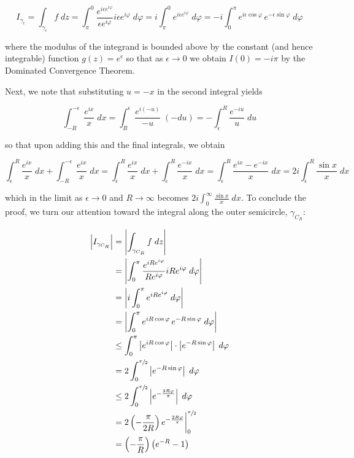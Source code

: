 \begin{solution}
    $$
    I_{\gamma_{\epsilon}} 
      = \int_{\gamma_{\epsilon}} {f \; dz } 
      = \int_{\pi}^{0} {\frac{e^{i \epsilon e^{i \varphi}}}{\epsilon e^{i \varphi}} i \epsilon e^{i \varphi} \; d\varphi }
      = i \int_{\pi}^{0} {e^{i \epsilon e^{i \varphi}} \; d\varphi }
      = -i \int_{0}^{\pi} {e^{i \epsilon \cos{\varphi}} \, e^{-\epsilon \sin{\varphi}} \; d\varphi }
    $$

    where the modulus of the integrand is bounded above by the constant (and hence integrable) function 
    $g(z) = e^{\epsilon}$ so that as $\epsilon \to 0$ we obtain $I(0) = -i \pi$ by the Dominated Convergence Theorem.
    
    \pagebreak
    Next, we note that substituting $u = -x$ in the second integral yields

    $$
    \int_{-R}^{-\epsilon} {\frac{e^{ix}}{x} \; dx} 
    = \int_{R}^{\epsilon} {\frac{e^{i(-u)}}{-u} \; (-du)}
    = -\int_{\epsilon}^{R} {\frac{e^{-iu}}{u} \; du}
    $$

    so that upon adding this and the final integrals, we obtain

    $$
    \int_{\epsilon}^{R} {\frac{e^{ix}}{x} \; dx} + \int_{-R}^{-\epsilon} {\frac{e^{ix}}{x} \; dx} 
    = \int_{\epsilon}^{R} {\frac{e^{ix}}{x} \; dx} + \int_{\epsilon}^{R} {\frac{e^{-ix}}{x} \; dx}
    = \int_{\epsilon}^{R} {\frac{e^{ix} - e^{-ix}}{x} \; dx}
    = 2i \int_{\epsilon}^{R} {\frac{\sin{x}}{x} \; dx}
    $$

    which in the limit as $\epsilon \to 0$ and $R \to \infty$ becomes $2i \int_{0}^{\infty} {\frac{\sin{x}}{x} \; dx}$.
    To conclude the proof, we turn our attention toward the integral along the outer semicircle, $\gamma_{C_R}$:

    \begin{align*}
    \left| I_{\gamma_{C_R}} \right|
      &= \left| \int_{\gamma_{C_R}} {f \; dz } \right| \\
      &= \left| \int_{0}^{\pi} {\frac{e^{i R e^{i \varphi}}}{R e^{i \varphi}} i R e^{i \varphi} \; d\varphi } \right| \\
      &= \left| i \int_{0}^{\pi} {e^{i R e^{i \varphi}} \; d\varphi } \right| \\
      &= \left| \int_{0}^{\pi} {e^{i R \cos{\varphi}} \, e^{-R \sin{\varphi}} \; d\varphi } \right| \\
      &\le \int_{0}^{\pi} {\left| e^{i R \cos{\varphi}}\right| \cdot \left| e^{-R \sin{\varphi}} \right| \; d\varphi } \\
      &=   2 \int_{0}^{\sfrac{\pi}{2}} {\left| e^{-R \sin{\varphi}} \right| \; d\varphi } \\
      &\le 2 \int_{0}^{\sfrac{\pi}{2}} {\left| e^{-\frac{2 R \varphi}{\pi} } \right| \; d\varphi } \\
      &=   2 \left( -\frac{\pi}{2 R} \right) e^{-\frac{2 R \varphi}{\pi}} \bigg|_0^{\sfrac{\pi}{2}} \\
      &=   \left( -\frac{\pi}{R} \right) \left( e^{-R} - 1 \right)
    \end{align*}


\end{solution}
